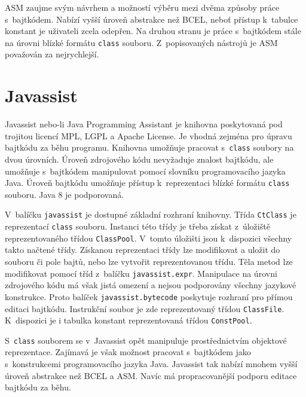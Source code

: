 ASM zaujme svým návrhem a možností výběru mezi dvěma způsoby práce s~bajtkódem. Nabízí vyšší úroveň abstrakce než BCEL, neboť přístup k~tabulce konstant je uživateli zcela odepřen. Na druhou stranu je práce s~bajtkódem stále na úrovni blízké formátu \texttt{class} souboru. Z~popisovaných nástrojů je ASM považován za nejrychlejší.


\section{Javassist}\label{Tools:Javassist}

Javassist \cite{Javassist} nebo-li Java Programming Assistant je knihovna poskytovaná pod trojitou licencí MPL, LGPL a Apache License. Je vhodná zejména pro úpravu bajtkódu za běhu programu. Knihovna umožňuje pracovat s~\texttt{class} soubory na dvou úrovních. Úroveň zdrojového kódu nevyžaduje znalost bajtkódu, ale umožňuje s~bajtkódem manipulovat pomocí slovníku programovacího jazyka Java. Úroveň bajtkódu umožňuje přístup k~reprezentaci blízké formátu \texttt{class} souboru. Java 8 je podporovaná.

V~balíčku \texttt{javassist} je dostupné základní rozhraní knihovny. Třída \texttt{CtClass} je reprezentací \texttt{class} souboru. Instanci této třídy je třeba získat z~úložiště reprezentovaného třídou \texttt{ClassPool}. V~tomto úložišti jsou k~dispozici všechny takto načtené třídy. Získanou reprezentaci třídy lze modifikovat a uložit do souboru či pole bajtů, nebo lze vytvořit reprezentovanou třídu. Těla metod lze modifikovat pomocí tříd z~balíčku \texttt{javassist.expr}. Manipulace na úrovni zdrojového kódu má však jistá omezení a nejsou podporovány všechny jazykové konstrukce. Proto balíček \texttt{javassist.bytecode} poskytuje rozhraní pro přímou editaci bajtkódu. Instrukční soubor je zde reprezentovaný třídou \texttt{ClassFile}. K~dispozici je i tabulka konstant reprezentovaná třídou \texttt{ConstPool}.

S~\texttt{class} souborem se v~Javassist opět manipuluje prostřednictvím objektové reprezentace. Zajímavá je však možnost pracovat s~bajtkódem jako s~konstrukcemi programovacího jazyka Java. Javassist tak nabízí mnohem vyšší úroveň abstrakce než BCEL a ASM. Navíc má propracovanější podporu editace bajtkódu za běhu.

